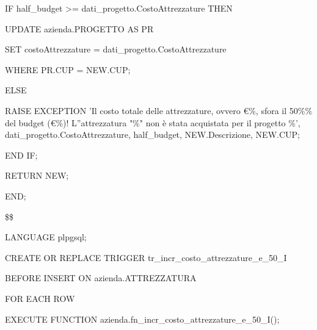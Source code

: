 \begin{flushleft}
\begin{description}
\begin{description}
                    \item IF half\_budget >= dati\_progetto.CostoAttrezzature THEN
                    \begin{description}
                        \item UPDATE azienda.PROGETTO AS PR
                        \item SET costoAttrezzature = dati\_progetto.CostoAttrezzature
                        \item WHERE PR.CUP = NEW.CUP;
                    \end{description}
                    \item ELSE
                    \begin{description}
                        \item RAISE EXCEPTION 'Il costo totale delle attrezzature, ovvero €\%, sfora il 50\%\% del budget (€\%)! L''attrezzatura "\%" non è stata acquistata per il progetto \%', dati\_progetto.CostoAttrezzature, half\_budget, NEW.Descrizione, NEW.CUP;
                    \end{description}
                    \item END IF;
                
                    \item RETURN NEW;

                \end{description}

                \item END;
                \item \$\$
                \item LANGUAGE plpgsql;
            \end{description}
        \end{flushleft}
    \normalfont

    \ttfamily
        \begin{flushleft}
            \begin{description}
                \item CREATE OR REPLACE TRIGGER tr\_incr\_costo\_attrezzature\_e\_50\_I
                \item BEFORE INSERT ON azienda.ATTREZZATURA
                \item FOR EACH ROW
                \item EXECUTE FUNCTION azienda.fn\_incr\_costo\_attrezzature\_e\_50\_I();
            \end{description}
        \end{flushleft}
    \normalfont

